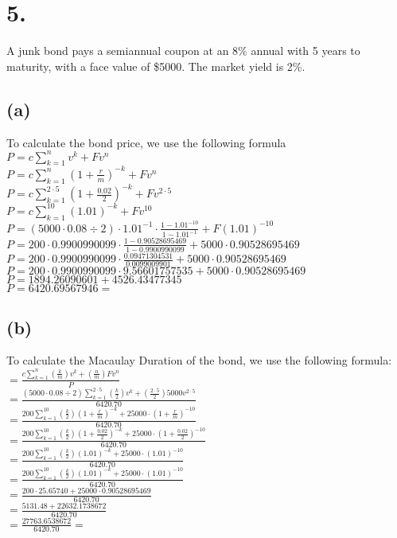 \documentclass{article}
\begin{document}
\section*{5.}
{\Large 

A junk bond pays a semiannual coupon at an 8\% annual with 5 years to maturity, with a face value of \$5000. The market yield is 2\%.

\subsection*{(a)}

To calculate the bond price, we use the following formula \\
$P = c \sum_{k=1}^{n} v^k + Fv^n$ \\
$P = c \sum_{k=1}^{n} (1 + \frac{r}{m})^{-k} + Fv^n$ \\
$P = c \sum_{k=1}^{2 \cdot 5} (1 + \frac{0.02}{2})^{-k} + Fv^{2 \cdot 5}$ \\
$P = c \sum_{k=1}^{10} (1.01)^{-k} + Fv^{10}$ \\ 
$P = (5000 \cdot 0.08 \div 2) \cdot 1.01^{-1} \cdot \frac{1 - 1.01^{-10}}{1 - 1.01^{-1}} + F(1.01)^{-10}$ \\
$P = 200 \cdot 0.9900990099 \cdot \frac{1 - 0.90528695469}{1 - 0.9900990099} + 5000 \cdot 0.90528695469$ \\
$P = 200 \cdot 0.9900990099 \cdot \frac{0.09471304531}{0.0099009901} + 5000 \cdot 0.90528695469$ \\
$P = 200 \cdot 0.9900990099 \cdot 9.56601757535 + 5000 \cdot 0.90528695469$
$P = 1894.26090601 + 4526.43477345$ \\
$P = 6420.69567946 = $ 

\subsection*{(b)}

To calculate the Macaulay Duration of the bond, we use the following formula: \\
$= \frac{c \sum_{k=1}^{n} (\frac{k}{m}) v^k + (\frac{n}{m})Fv^n}{P}$ \\
$= \frac{(5000 \cdot 0.08 \div 2) \sum_{k=1}^{2 \cdot 5} (\frac{k}{2}) v^k + (\frac{2 \cdot 5}{2})5000v^{2 \cdot 5}}{6420.70}$ \\
$= \frac{200 \sum_{k=1}^{10} (\frac{k}{2}) (1 + \frac{r}{m})^{-k} + 25000\cdot {(1 + \frac{r}{m})}^{-10}}{6420.70}$ \\
$= \frac{200 \sum_{k=1}^{10} (\frac{k}{2}) (1 + \frac{0.02}{2})^{-k} + 25000 \cdot {(1 + \frac{0.02}{2})}^{-10}}{6420.70}$ \\
$= \frac{200 \sum_{k=1}^{10} (\frac{k}{2}) (1.01)^{-k} + 25000 \cdot (1.01)^{-10}}{6420.70}$ \\
$= \frac{200 \sum_{k=1}^{10} (\frac{k}{2}) (1.01)^{-k} + 25000 \cdot (1.01)^{-10}}{6420.70}$ \\
$= \frac{200 \cdot 25.65740 + 25000 \cdot 0.90528695469}{6420.70}$ \\
$= \frac{5131.48 + 22632.1738672}{6420.70}$ \\
$= \frac{27763.6538672}{6420.70} = $ 

}
\end{document}
